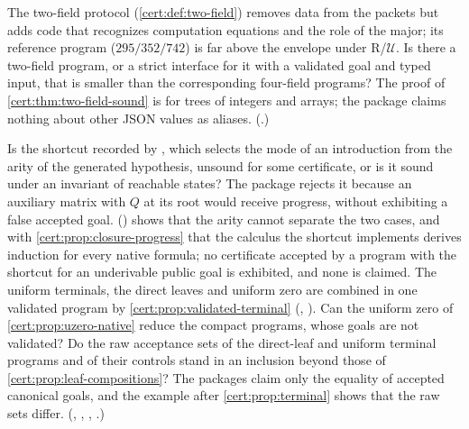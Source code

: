 \begin{question}
The two-field protocol (\cref{cert:def:two-field}) removes data from the
packets but adds code that recognizes computation equations and the role of
the major; its reference program ($295/352/742$) is far above the envelope
under R/$\mathcal U$. Is there a two-field program, or a strict interface for
it with a validated goal and typed input, that is smaller than the
corresponding four-field programs? The proof of
\cref{cert:thm:two-field-sound} is for trees of integers and arrays; the
package claims nothing about other JSON values as aliases. (.)
\end{question}

\begin{question}
Is the shortcut recorded by , which selects the mode of an
introduction from the arity of the generated hypothesis, unsound for some
certificate, or is it sound under an invariant of reachable states? The
package rejects it because an auxiliary matrix with $Q$ at its root would
receive progress, without exhibiting a false accepted goal.
 () shows that the arity
cannot separate the two cases, and with \cref{cert:prop:closure-progress} that
the calculus the shortcut implements derives induction for every native formula;
no certificate accepted by a program with the shortcut for an underivable public
goal is exhibited, and none is claimed. The uniform
terminals, the direct leaves and uniform zero are combined in one validated
program by \cref{cert:prop:validated-terminal} (,
). Can the uniform zero of \cref{cert:prop:uzero-native}
reduce the compact programs, whose goals are not validated? Do the raw acceptance sets
of the direct-leaf and uniform terminal programs and of their controls stand
in an inclusion beyond those of \cref{cert:prop:leaf-compositions}? The packages
claim only the equality of accepted canonical goals, and the example after
\cref{cert:prop:terminal} shows that the raw sets differ.
(, , ,
.)
\end{question}

